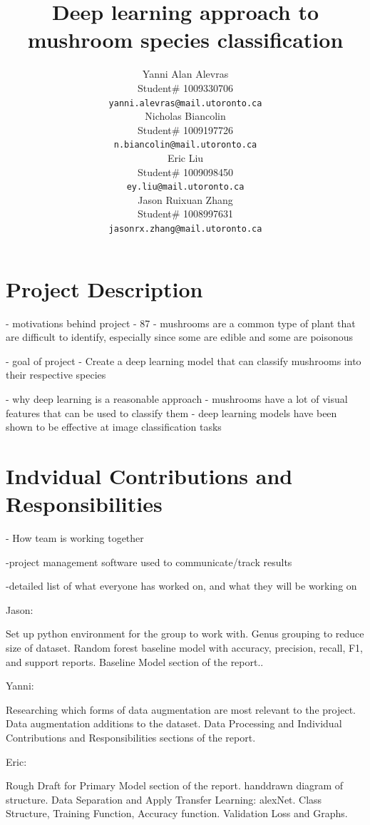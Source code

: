 \documentclass{article} %
\title{Deep learning approach to  \\ 
mushroom species classification}
\author{Yanni Alan Alevras  \\
Student\# 1009330706 \\
\texttt{yanni.alevras@mail.utoronto.ca} \\
\And
Nicholas Biancolin  \\
Student\# 1009197726 \\
\texttt{n.biancolin@mail.utoronto.ca} \\
\AND
Eric Liu  \\
Student\# 1009098450 \\
\texttt{ey.liu@mail.utoronto.ca} \\
\And
Jason Ruixuan Zhang \\
Student\# 1008997631 \\
\texttt{jasonrx.zhang@mail.utoronto.ca} \\
\AND
}
\begin{document}
\maketitle

\section{Project Description}
\label{sec:project_description}

- motivations behind project
    - 87%
    - mushrooms are a common type of plant that are difficult to identify, especially since some are edible and some are poisonous

- goal of project
    - Create a deep learning model that can classify mushrooms into their respective species

- why deep learning is a reasonable approach
    - mushrooms have a lot of visual features that can be used to classify them
    - deep learning models have been shown to be effective at image classification tasks

\section{Indvidual Contributions and Responsibilities}
\label{sec:individual_contributions_and_responsibilities}

- How team is working together


-project management software used to communicate/track results


-detailed list of what everyone has worked on, and what they will be working on

Jason:

Set up python environment for the group to work with. Genus grouping to reduce size of dataset. Random forest baseline model with accuracy, precision, recall, F1, and support reports. Baseline Model section of the report..

Yanni:

Researching which forms of data augmentation are most relevant to the project. Data augmentation additions to the dataset. Data Processing and Individual Contributions and Responsibilities sections of the report. 

Eric:

Rough Draft for Primary Model section of the report. handdrawn diagram of structure. Data Separation and Apply Transfer Learning: alexNet. Class Structure, Training Function, Accuracy function. Validation Loss and Graphs.
\end{document}
